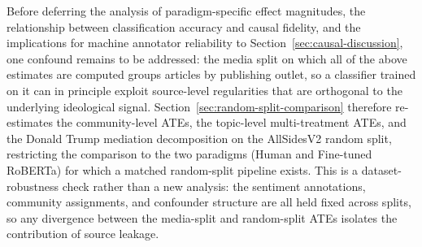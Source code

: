 Before deferring the analysis of paradigm-specific effect magnitudes, the relationship between classification accuracy and causal fidelity, and the implications for machine annotator reliability to Section~\ref{sec:causal-discussion}, one confound remains to be addressed: the media split on which all of the above estimates are computed groups articles by publishing outlet, so a classifier trained on it can in principle exploit source-level regularities that are orthogonal to the underlying ideological signal. Section~\ref{sec:random-split-comparison} therefore re-estimates the community-level ATEs, the topic-level multi-treatment ATEs, and the Donald Trump mediation decomposition on the AllSidesV2 random split, restricting the comparison to the two paradigms (Human and Fine-tuned RoBERTa) for which a matched random-split pipeline exists. This is a dataset-robustness check rather than a new analysis: the sentiment annotations, community assignments, and confounder structure are all held fixed across splits, so any divergence between the media-split and random-split ATEs isolates the contribution of source leakage.
